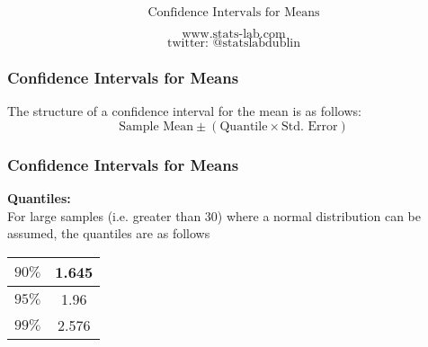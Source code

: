 \documentclass{beamer}
\begin{document}
\begin{frame}

{
\Huge
\[\mbox{Confidence Intervals for Means} \]
}
{
\Large

\[\mbox{www.stats-lab.com} \]
\[ \mbox{twitter: @statslabdublin} \] 

}
\end{frame}
\begin{frame}

\frametitle{Confidence Intervals for Means}
\LARGE
The structure of a confidence interval for the mean is as follows:
\[ \mbox{Sample Mean} \pm  \left( \mbox{Quantile} \times \mbox{Std. Error}  \right) \]
\end{frame}
\begin{frame}
\frametitle{Confidence Intervals for Means}
\LARGE
\textbf{Quantiles:}\\
For large samples (i.e. greater than 30) where a normal distribution can be assumed, the quantiles 
are as follows\\ \bigskip
\begin{center}
\begin{tabular}{|c|c|}
\hline  $90\%$  &   1.645  \\ 
\hline  $95\%$  &   1.96  \\
\hline  $99\%$  &   2.576 \\ 
\hline 
\end{tabular} 
\end{center}
\end{frame}
\end{document}
